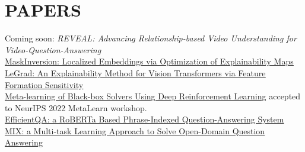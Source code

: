 \documentclass[]{deedy-resume-openfont}
\begin{document}
\begin{minipage}[t]{0.66\textwidth} 

\section{PAPERS} 
\textbullet{} Coming soon: \textit{REVEAL: Advancing Relationship-based Video Understanding for Video-Question-Answering} \\
\textbullet{} \href{https://arxiv.org/pdf/2407.20034}{\underline{MaskInversion: Localized Embeddings via Optimization of Explainability Maps}} \\
\textbullet{} \href{https://arxiv.org/abs/2404.03214}{\underline{LeGrad: An Explainability Method for Vision Transformers via Feature Formation Sensitivity}} \\
\textbullet{} \href{https://openreview.net/forum?id=9pO8hSVu0J}{\underline{Meta-learning of Black-box Solvers Using Deep Reinforcement Learning}} accepted to NeurIPS 2022 MetaLearn workshop. \\
\textbullet{} \href{https://arxiv.org/abs/2101.02157}{\underline{EfficientQA: a RoBERTa Based Phrase-Indexed Question-Answering System}} \\
\textbullet{} \href{https://arxiv.org/abs/2012.09766}{\underline{MIX: a Multi-task Learning Approach to Solve Open-Domain Question Answering}} \\
\sectionsep

\end{minipage} 
\end{document}
